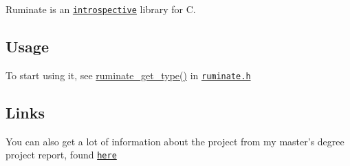 Ruminate is an \href{http://en.wikipedia.org/wiki/Introspection_(computer_science)}{\tt introspective} library for C.

\subsection*{Usage}

To start using it, see \hyperlink{ruminate_2ruminate_8h_a1d17861ce087a20632d29f3b6e09dccb}{ruminate\-\_\-get\-\_\-type()} in \href{http://rus.har.mn/ruminate/ruminate_2ruminate_8h.html}{\tt ruminate.\-h}

\subsection*{Links}

You can also get a lot of information about the project from my master's degree project report, found \href{http://rus.har.mn/files/project-report.pdf}{\tt here} 